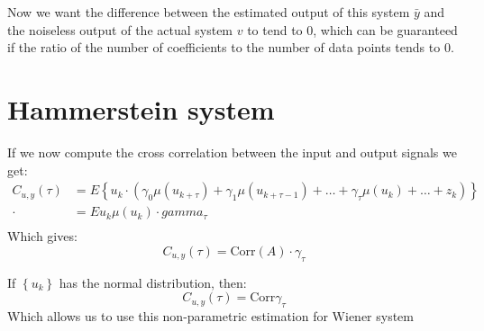 Now we want the difference between the estimated output of this system $\bar{y}$ and the noiseless output of the actual system  $v$ to tend to 0, which can be 
guaranteed if the ratio of the number of coefficients to the number of data points tends to 0.


\section{Hammerstein system}



If we now compute the cross correlation between the input and output signals we get:
\begin{equation}
    \begin{aligned}
        C_{u,y}(\tau)&=E\left\{u_k\cdot\left( \gamma_0\mu(u_{k+\tau}) + \gamma_1\mu(u_{k+\tau-1}) + \dots + \gamma_\tau\mu(u_k) + \dots + z_k  \right)\right\}&\mbox{}\\[1.25ex]
        \cdot&=Eu_k\mu(u_k) \cdot gamma_\tau &\mbox{}\\[1.25ex]
    \end{aligned}
\end{equation}
Which gives:
\begin{equation}
    C_{u,y}(\tau) = \text{Corr}(A)\cdot \gamma_\tau
\end{equation}

    {
        If $\left\{u_k\right\}$ has the normal distribution, then:
         \begin{equation}
             C_{u,y}(\tau) = \text{Corr}\gamma_\tau
        \end{equation}
        Which allows us to use this non-parametric estimation for Wiener system
    }

